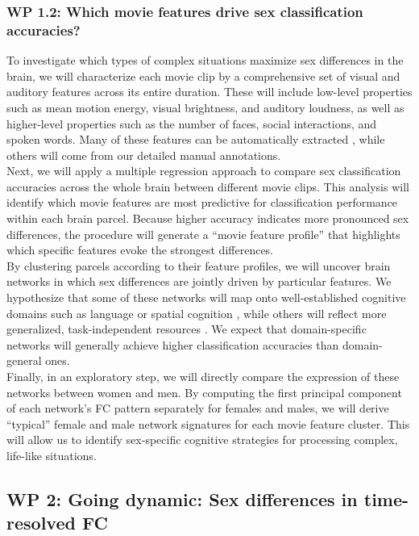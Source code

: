 \documentclass[11pt,a4paper]{article}
\begin{document}
\subsubsection*{WP 1.2: Which movie features drive sex classification accuracies?}
To investigate which types of complex situations maximize sex differences in the brain, we will characterize each movie clip by a 
comprehensive set of visual and auditory features across its entire duration. These will include low-level 
properties such as mean motion energy, visual brightness, and auditory loudness, as well as higher-level properties such as the 
number of faces, social interactions, and spoken words. Many of these features can be automatically 
extracted \parencite{mcnamaraDevelopingComprehensiveFramework2017a,radfordRobustSpeechRecognition2022}, while others will come 
from our detailed manual annotations.\\
Next, we will apply a multiple regression approach to compare sex classification accuracies across the whole brain between 
different movie clips. This analysis will identify which movie features are most predictive for 
classification performance within each brain parcel. Because higher accuracy indicates more pronounced sex differences, 
the procedure will generate a “movie feature profile” that highlights which specific features evoke the strongest differences.\\
By clustering parcels according to their feature profiles, we will uncover brain networks in which sex differences are jointly 
driven by particular features. We hypothesize that some of these networks will map onto well-established cognitive domains such as 
language or spatial cognition \parencite{halpernSexDifferencesCognitive2000a,kimuraSexCognition2000a}, while others will 
reflect more generalized, task-independent resources \parencite{hugdahlExistenceGeneralizedNonspecific2015a}. 
We expect that domain-specific networks will generally achieve higher classification accuracies than domain-general ones.\\
Finally, in an exploratory step, we will directly compare the expression of these networks between women and men. 
By computing the first principal component of each network's FC pattern separately for females and males, we will 
derive “typical” female and male network signatures for each movie feature cluster. This will allow us to identify 
sex-specific cognitive strategies for processing complex, life-like situations.

\subsection*{WP 2: Going dynamic: Sex differences in time-resolved FC}
\end{document}
